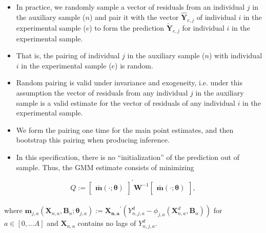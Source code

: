 \documentclass[static]{JJH-Beamer}
\begin{document}
\begin{frame}

\begin{itemize}
\item In practice, we randomly sample a vector of residuals from an individual $j$ in the auxiliary sample ($n$) and pair it with the vector $\hat{\bm{Y}}_{e,j}$ of individual $i$ in the experimental sample ($e$) to form the prediction $\tilde{\bm{Y}}_{e,j}$ for individual $i$ in the experimental sample.
\item That is, the pairing of individual $j$ in the auxiliary sample ($n$) with individual $i$ in the experimental sample ($e$) is random.
\item Random pairing is valid under invariance and exogeneity, i.e. under this assumption the vector of residuals from any individual $j$ in the auxiliary sample is a valid estimate for the vector of residuals of any individual $i$ in the experimental sample.
\item We form the pairing one time for the main point estimates, and then bootstrap this pairing when producing inference.
\end{itemize}

\end{frame}

\begin{frame}

\begin{itemize}
\item In this specification, there is no ``initialization'' of the prediction out of sample. Thus, the GMM estimate consists of minimizing
\end{itemize}

\begin{equation}
Q :=  {\begin{bmatrix} {\bm{\bar{m}} \left( \cdot ; \bm{\theta} \right) }  \end{bmatrix}}^{'}
\bm{W} ^{-1}{\begin{bmatrix} {\bm{\bar{m}} \left( \cdot ; \bm{\theta} \right) }   \end{bmatrix}}, \label{eq:wlossspec2}
\end{equation}\\

\noindent where $\bm{m}_{j,a} \left( \bm{X}_{n,a}, \bm{B}_{n} ; \bm{\theta}_{j,a} \right) := {\bm{X_{n,a}}}^{'} \left( Y_{n,j,a}^d -   \phi_{j,a} \left( \bm{X}_{n,a}^d, \bm{B}_{n} \right) \right)$ for $a \in [0, \ldots A]$ and  $\bm{X}_{n,a}$ contains no lags of $Y_{n,j,a}^d$.

\end{frame}
\end{document}
